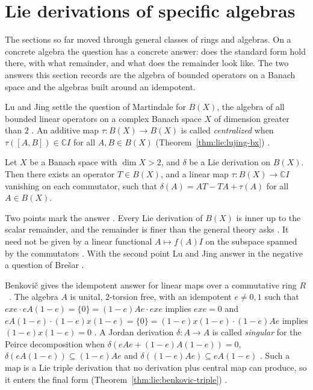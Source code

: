 \section{Lie derivations of specific algebras}\label{sec:lie-type:lie-on-algebras}

The sections so far moved through general classes of rings and algebras. On a
concrete algebra the question has a concrete answer: does the standard form
hold there, with what remainder, and what does the remainder look like. The
two answers this section records are the algebra of bounded operators on a
Banach space and the algebras built around an idempotent.

Lu and Jing settle the question of Martindale for $B(X)$, the algebra of all
bounded linear operators on a complex Banach space $X$ of dimension greater
than $2$ \cite[p.~91]{LuJing2010}. An additive map $\tau\colon B(X)\to B(X)$
is called \emph{centralized} when $\tau([A,B])\in\mathbb{C}I$ for all
$A,B\in B(X)$ (Theorem~\ref{thm:lie:lujing-bx}) \cite[p.~91]{LuJing2010}.

\begin{theorem}\label{thm:lie:lujing-bx}
Let $X$ be a Banach space with $\dim X>2$, and $\delta$ be a Lie derivation on
$B(X)$. Then there exists an operator $T\in B(X)$, and a linear map
$\tau\colon B(X)\to\mathbb{C}I$ vanishing on each commutator, such that
$\delta(A)=AT-TA+\tau(A)$ for all $A\in B(X)$.
\end{theorem}

Two points mark the answer \cite[p.~91]{LuJing2010}. Every Lie derivation of
$B(X)$ is inner up to the scalar remainder, and the remainder is finer than
the general theory asks \cite[p.~91]{LuJing2010}. It need not be given by a
linear functional $A\mapsto f(A)I$ on the subspace spanned by the commutators
\cite[p.~91]{LuJing2010}. With the second point Lu and Jing answer in the
negative a question of Brešar \cite[p.~92]{LuJing2010}.

Benkovič gives the idempotent answer for linear maps over a commutative ring
$R$~\cite[p.~144]{Benkovic2015}. The algebra $A$ is unital, $2$-torsion free, with an idempotent $e\ne0,1$
such that $exe\cdot eA(1-e)=\{0\}=(1-e)Ae\cdot exe$ implies $exe=0$ and
$eA(1-e)\cdot(1-e)x(1-e)=\{0\}=(1-e)x(1-e)\cdot(1-e)Ae$ implies
$(1-e)x(1-e)=0$ \cite[p.~141]{Benkovic2015}. A Jordan derivation $\delta\colon
A\to A$ is called \emph{singular} for the Peirce decomposition when
$\delta(eAe+(1-e)A(1-e))=0$, $\delta(eA(1-e))\subseteq(1-e)Ae$ and
$\delta((1-e)Ae)\subseteq eA(1-e)$ \cite[p.~144]{Benkovic2015}. Such a map is
a Lie triple derivation that no derivation plus central map can produce, so it
enters the final form (Theorem~\ref{thm:lie:benkovic-triple})
\cite[p.~144]{Benkovic2015}.

